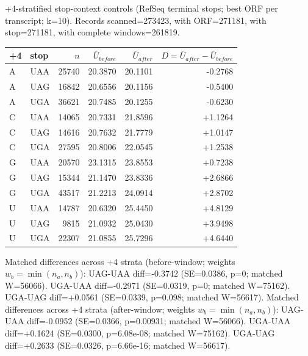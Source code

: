 +4-stratified stop-context controls (RefSeq terminal stops; best ORF per transcript; k=10). Records scanned=273423, with ORF=271181, with stop=271181, with complete windows=261819.
\begin{center}
\small
\setlength{\tabcolsep}{6pt}
\renewcommand{\arraystretch}{1.15}
\begin{tabular}{llrrrr}
\toprule
+4 & stop & $n$ & $\overline{U}_{before}$ & $\overline{U}_{after}$ & $D=\overline{U}_{after}-\overline{U}_{before}$ \\
\midrule
A & UAA & 25740 & 20.3870 & 20.1101 & -0.2768 \\
A & UAG & 16842 & 20.6556 & 20.1156 & -0.5400 \\
A & UGA & 36621 & 20.7485 & 20.1255 & -0.6230 \\
C & UAA & 14065 & 20.7331 & 21.8596 & +1.1264 \\
C & UAG & 14616 & 20.7632 & 21.7779 & +1.0147 \\
C & UGA & 27595 & 20.8006 & 22.0545 & +1.2538 \\
G & UAA & 20570 & 23.1315 & 23.8553 & +0.7238 \\
G & UAG & 15344 & 21.1470 & 23.8336 & +2.6866 \\
G & UGA & 43517 & 21.2213 & 24.0914 & +2.8702 \\
U & UAA & 14787 & 20.6320 & 25.4450 & +4.8129 \\
U & UAG & 9815 & 21.0932 & 25.0430 & +3.9498 \\
U & UGA & 22307 & 21.0855 & 25.7296 & +4.6440 \\
\bottomrule
\end{tabular}
\end{center}
\noindent Matched differences across +4 strata (before-window; weights $w_b=\min(n_a,n_b)$):
 UAG-UAA diff=-0.3742 (SE=0.0386, p=0; matched W=56066).
 UGA-UAA diff=-0.2971 (SE=0.0319, p=0; matched W=75162).
 UGA-UAG diff=+0.0561 (SE=0.0339, p=0.098; matched W=56617).
\noindent Matched differences across +4 strata (after-window; weights $w_b=\min(n_a,n_b)$):
 UAG-UAA diff=-0.0952 (SE=0.0366, p=0.00931; matched W=56066).
 UGA-UAA diff=+0.1624 (SE=0.0300, p=6.08e-08; matched W=75162).
 UGA-UAG diff=+0.2633 (SE=0.0326, p=6.66e-16; matched W=56617).
